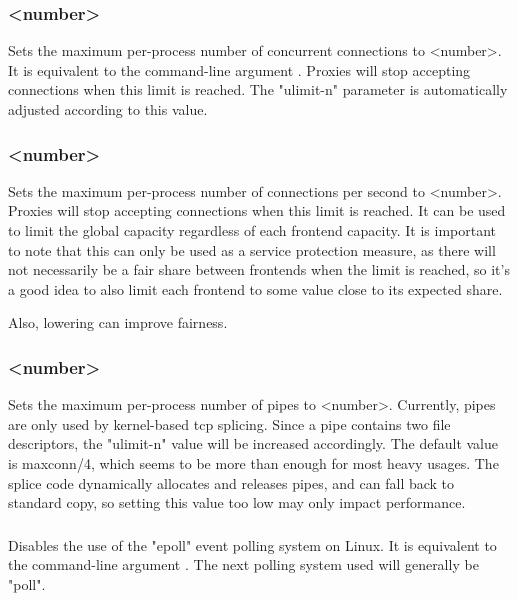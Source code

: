 \subsubsection[maxconn]{ <number>}

Sets the maximum per-process number of concurrent connections to <number>. It
is equivalent to the command-line argument . Proxies will stop accepting
connections when this limit is reached. The "ulimit-n" parameter is
automatically adjusted according to this value.


\subsubsection[maxconnrate]{ <number>}

Sets the maximum per-process number of connections per second to <number>.
Proxies will stop accepting connections when this limit is reached. It can be
used to limit the global capacity regardless of each frontend capacity. It is
important to note that this can only be used as a service protection measure,
as there will not necessarily be a fair share between frontends when the
limit is reached, so it's a good idea to also limit each frontend to some
value close to its expected share.

Also, lowering  can improve fairness.

\subsubsection[maxpipes]{ <number>}
Sets the maximum per-process number of pipes to <number>. Currently, pipes
are only used by kernel-based tcp splicing. Since a pipe contains two file
descriptors, the "ulimit-n" value will be increased accordingly. The default
value is maxconn/4, which seems to be more than enough for most heavy usages.
The splice code dynamically allocates and releases pipes, and can fall back
to standard copy, so setting this value too low may only impact performance.

\subsubsection[noepoll]{}

Disables the use of the "epoll" event polling system on Linux. It is
equivalent to the command-line argument . The next polling system
used will generally be "poll".


